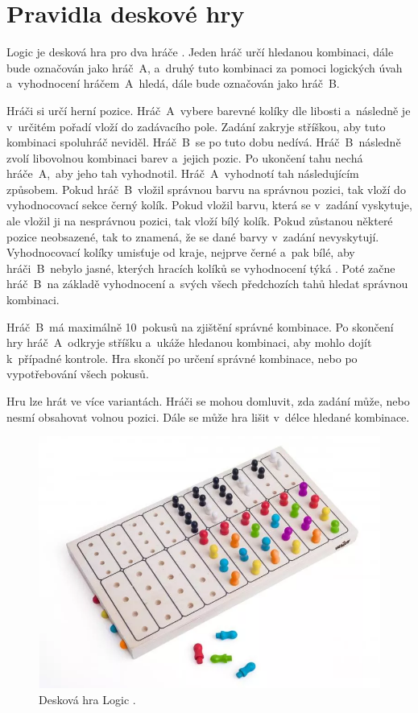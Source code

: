 \chapter{Pravidla deskové hry}
Logic je desková hra pro dva hráče \cite{Logic_pravidla}. Jeden hráč určí hledanou kombinaci, dále bude označován jako 
hráč~A, a~druhý tuto kombinaci za pomoci logických úvah a~vyhodnocení hráčem~A~hledá, dále bude označován jako hráč~B.

Hráči si určí herní pozice. Hráč~A~vybere barevné kolíky dle libosti a~následně je v~určitém pořadí vloží do zadávacího pole. Zadání zakryje
stříškou, aby tuto
kombinaci spoluhráč neviděl. Hráč~B~se po tuto dobu nedívá. Hráč~B~následně zvolí libovolnou kombinaci barev a~jejich pozic. Po 
ukončení tahu nechá
hráče~A,~aby jeho tah vyhodnotil. Hráč~A~vyhodnotí tah následujícím způsobem. Pokud hráč~B~vložil správnou barvu na správnou pozici, tak vloží 
do vyhodnocovací sekce černý kolík. Pokud vložil barvu, která se v~zadání vyskytuje, ale vložil ji na nesprávnou pozici, tak vloží bílý kolík.
Pokud zůstanou některé pozice neobsazené, tak to znamená, že se dané barvy v~zadání nevyskytují. 
Vyhodnocovací kolíky umisťuje od kraje, nejprve černé a~pak bílé, aby hráči~B~nebylo jasné, kterých hracích kolíků se vyhodnocení 
týká \cite{Logic_pravidla}.
Poté začne hráč~B~na základě vyhodnocení a~svých všech předchozích tahů hledat správnou kombinaci.

Hráč~B~má maximálně 10~pokusů na zjištění správné kombinace. Po skončení hry hráč~A~odkryje stříšku a~ukáže hledanou kombinaci, aby mohlo dojít
k~případné kontrole. Hra skončí po určení správné kombinace, nebo po vypotřebování všech pokusů.

Hru lze hrát ve více variantách. Hráči se mohou domluvit, zda zadání může, nebo nesmí obsahovat volnou pozici. Dále se může hra lišit v~délce hledané 
kombinace.

\begin{figure}[!h]
  \begin{center}
    \includegraphics[scale=0.6]{obrazky/Logic_deskovka.png}
  \end{center}
  \caption[Desková hra Logic \cite{Logic_deskovka}]{Desková hra Logic \cite{Logic_deskovka}.}
\end{figure}


